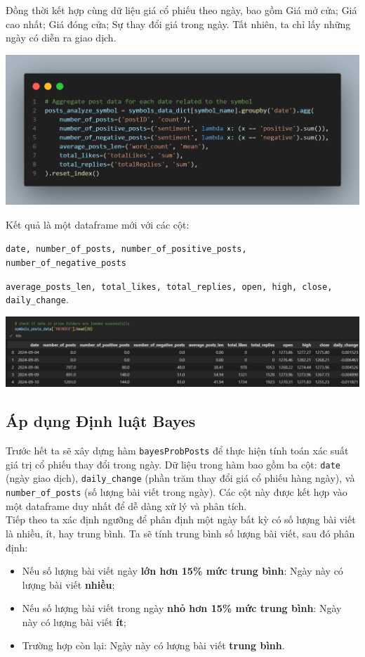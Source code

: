Đồng thời kết hợp cùng dữ liệu giá cổ phiếu theo ngày, bao gồm Giá mở cửa; Giá cao nhất; Giá đóng cửa; Sự thay đổi giá trong ngày. Tất nhiên, ta chỉ lấy những ngày có diễn ra giao dịch.

\begin{center}
\includegraphics[width=0.8\linewidth]{images/code-5.2.png}
\end{center}

Kết quả là một dataframe mới với các cột:

\texttt{date, number\_of\_posts, number\_of\_positive\_posts, number\_of\_negative\_posts} 

\texttt{average\_posts\_len, total\_likes, total\_replies, open, high, close, daily\_change}.

\begin{center}
\includegraphics[width=1\linewidth]{images/code-5.3-aggreresult.png}
\end{center}

\subsection{Áp dụng Định luật Bayes}
Trước hết ta sẽ xây dựng hàm \texttt{bayesProbPosts} để thực hiện tính toán xác suất giá trị cổ phiếu thay đổi trong ngày. Dữ liệu trong hàm bao gồm ba cột: \texttt{date} (ngày giao dịch), \texttt{daily\_change} (phần trăm thay đổi giá cổ phiếu hàng ngày), và \texttt{number\_of\_posts} (số lượng bài viết trong ngày). Các cột này được kết hợp vào một dataframe duy nhất để dễ dàng xử lý và phân tích.\\

Tiếp theo ta xác định ngưỡng để phân định một ngày bất kỳ có số lượng bài viết là nhiều, ít, hay trung bình. Ta sẽ tính trung bình số lượng bài viết, sau đó phân định:
\begin{itemize}
\item Nếu số lượng bài viết ngày \textbf{lớn hơn 15\% mức trung bình}: Ngày này có lượng bài viết \textbf{nhiều};
\item Nếu số lượng bài viết trong ngày \textbf{nhỏ hơn 15\% mức trung bình}: Ngày này có lượng bài viết \textbf{ít};
\item Trường hợp còn lại: Ngày này có lượng bài viết \textbf{trung bình}.
\end{itemize}

